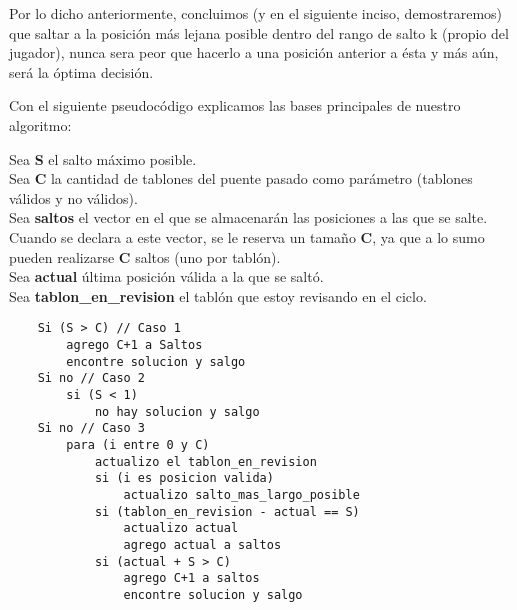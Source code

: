 Por lo dicho anteriormente, concluimos (y en el siguiente inciso, demostraremos) que saltar a la posición más lejana posible dentro del rango de salto k (propio del jugador), nunca sera peor que hacerlo a una posición anterior a ésta y más aún, será la óptima decisión.

Con el siguiente pseudocódigo explicamos las bases principales de nuestro algoritmo:

\noindent Sea \textbf{S} el salto m\'aximo posible.\\
Sea \textbf{C} la cantidad de tablones del puente pasado como par\'ametro (tablones v\'alidos y no v\'alidos).\\
Sea \textbf{saltos} el vector en el que se almacenar\'an las posiciones a las que se salte. Cuando se declara a este vector, se le reserva un tama\~no \textbf{C}, ya que a lo sumo pueden realizarse \textbf{C} saltos (uno por tabl\'on).\\
Sea \textbf{actual} última posición válida a la que se saltó.\\
Sea \textbf{tablon\_en\_revision} el tabl\'on que estoy revisando en el ciclo.\\

\begin{lstlisting}
	Si (S > C) // Caso 1
		agrego C+1 a Saltos
		encontre solucion y salgo
	Si no // Caso 2
		si (S < 1)	
			no hay solucion y salgo
	Si no // Caso 3
		para (i entre 0 y C)
			actualizo el tablon_en_revision
			si (i es posicion valida)
				actualizo salto_mas_largo_posible
			si (tablon_en_revision - actual == S)
				actualizo actual
				agrego actual a saltos
			si (actual + S > C)
				agrego C+1 a saltos
				encontre solucion y salgo

\end{lstlisting}

